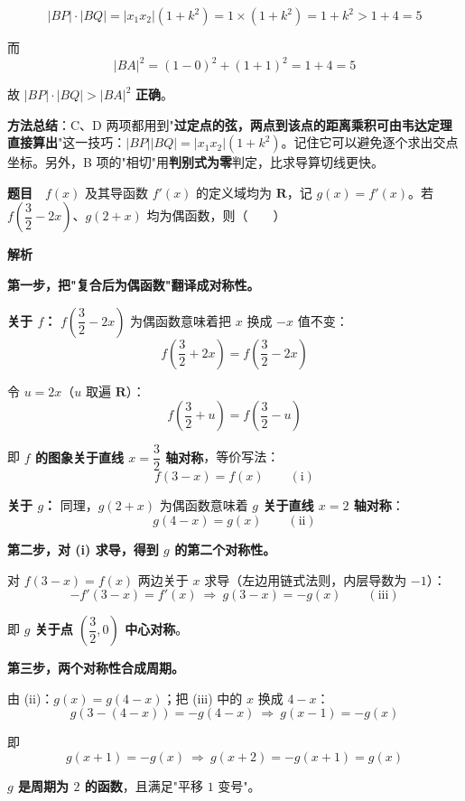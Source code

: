 \[|BP|\cdot|BQ|=\left|x_1x_2\right|\left(1+k^{2}\right)=1\times\left(1+k^{2}\right)=1+k^{2}>1+4=5\]

而
\[|BA|^{2}=(1-0)^{2}+(1+1)^{2}=1+4=5\]

故 $|BP|\cdot|BQ|>|BA|^{2}$  \textbf{正确}。


\begin{gktip}
\textbf{方法总结}：C、D 两项都用到"\textbf{过定点的弦，两点到该点的距离乘积可由韦达定理直接算出}"这一技巧：$|BP||BQ|=\left|x_1x_2\right|\left(1+k^2\right)$。记住它可以避免逐个求出交点坐标。另外，B 项的"相切"用\textbf{判别式为零}判定，比求导算切线更快。
\end{gktip}

\par\medskip


\textbf{题目}　$f(x)$ 及其导函数 $f'(x)$ 的定义域均为 $\mathbf R$，记 $g(x)=f'(x)$。若 $f\left(\dfrac32-2x\right)$、$g(2+x)$ 均为偶函数，则（　　）

\textbf{解析}

\textbf{第一步，把"复合后为偶函数"翻译成对称性。}

\textbf{关于 $f$：} $f\left(\dfrac32-2x\right)$ 为偶函数意味着把 $x$ 换成 $-x$ 值不变：
\[f\left(\frac32+2x\right)=f\left(\frac32-2x\right)\]

令 $u=2x$（$u$ 取遍 $\mathbf R$）：
\[f\left(\frac32+u\right)=f\left(\frac32-u\right)\]

即 \textbf{$f$ 的图象关于直线 $x=\dfrac32$ 轴对称}，等价写法：
\[f(3-x)=f(x)\qquad(\text{i})\]

\textbf{关于 $g$：} 同理，$g(2+x)$ 为偶函数意味着 \textbf{$g$ 关于直线 $x=2$ 轴对称}：
\[g(4-x)=g(x)\qquad(\text{ii})\]

\textbf{第二步，对 (i) 求导，得到 $g$ 的第二个对称性。}

对 $f(3-x)=f(x)$ 两边关于 $x$ 求导（左边用链式法则，内层导数为 $-1$）：
\[-f'(3-x)=f'(x)\ \Longrightarrow\ g(3-x)=-g(x)\qquad(\text{iii})\]

即 \textbf{$g$ 关于点 $\left(\dfrac32,0\right)$ 中心对称}。

\textbf{第三步，两个对称性合成周期。}

由 (ii)：$g(x)=g(4-x)$；把 (iii) 中的 $x$ 换成 $4-x$：
\[g\left(3-(4-x)\right)=-g(4-x)\ \Longrightarrow\ g(x-1)=-g(x)\]

即
\[g(x+1)=-g(x)\ \Longrightarrow\ g(x+2)=-g(x+1)=g(x)\]

\textbf{$g$ 是周期为 $2$ 的函数}，且满足"平移 $1$ 变号"。

